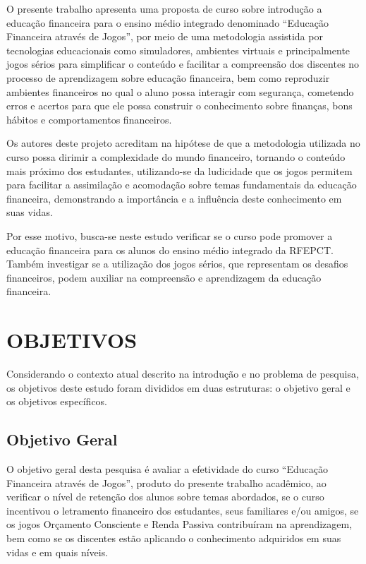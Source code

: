 O presente trabalho apresenta uma proposta de curso sobre introdução a educação financeira para o ensino médio integrado denominado “Educação Financeira através de Jogos”, por meio de uma metodologia assistida por tecnologias educacionais como simuladores, ambientes virtuais e principalmente jogos sérios para simplificar o conteúdo e facilitar a compreensão dos discentes no processo de aprendizagem sobre educação financeira, bem como reproduzir ambientes financeiros no qual o aluno possa interagir com segurança, cometendo erros e acertos para que ele possa construir o conhecimento sobre finanças, bons hábitos e comportamentos financeiros.

Os autores deste projeto acreditam na hipótese de que a metodologia utilizada no curso possa dirimir a complexidade do mundo financeiro, tornando o conteúdo mais próximo dos estudantes, utilizando-se da ludicidade que os jogos permitem para facilitar a assimilação e acomodação sobre temas fundamentais da educação financeira, demonstrando a importância e a influência deste conhecimento em suas vidas.

Por esse motivo, busca-se neste estudo verificar se o curso pode promover a educação financeira para os alunos do ensino médio integrado da RFEPCT. Também investigar se a utilização dos jogos sérios, que representam os desafios financeiros, podem auxiliar na compreensão e aprendizagem da educação financeira.

\section{OBJETIVOS}
Considerando o contexto atual descrito na introdução e no problema de pesquisa, os objetivos deste estudo foram divididos em duas estruturas: o objetivo geral e os objetivos específicos.

\subsection{Objetivo Geral}
O objetivo geral desta pesquisa é avaliar a efetividade do curso “Educação Financeira através de Jogos”, produto do presente trabalho acadêmico, ao verificar o nível de retenção dos alunos sobre temas abordados, se o curso incentivou o letramento financeiro dos estudantes, seus familiares e/ou amigos, se os jogos Orçamento Consciente e Renda Passiva contribuíram na aprendizagem, bem como se os discentes estão aplicando o conhecimento adquiridos em suas vidas e em quais níveis.

